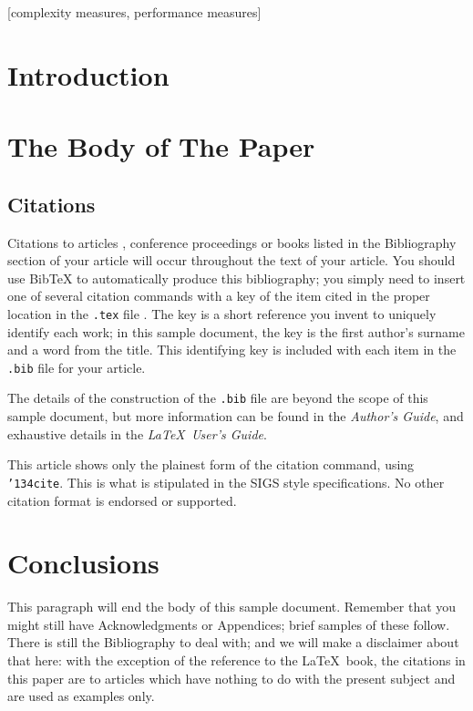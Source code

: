 \documentclass{sig-alternate}
\begin{document}
[complexity measures, performance measures]



\section{Introduction}
\section{The {\secit Body} of The Paper}
\subsection{Citations}
Citations to articles \cite{bowman:reasoning,
clark:pct, braams:babel, herlihy:methodology},
conference proceedings \cite{clark:pct} or
books \cite{salas:calculus, Lamport:LaTeX} listed
in the Bibliography section of your
article will occur throughout the text of your article.
You should use BibTeX to automatically produce this bibliography;
you simply need to insert one of several citation commands with
a key of the item cited in the proper location in
the \texttt{.tex} file \cite{Lamport:LaTeX}.
The key is a short reference you invent to uniquely
identify each work; in this sample document, the key is
the first author's surname and a
word from the title.  This identifying key is included
with each item in the \texttt{.bib} file for your article.

The details of the construction of the \texttt{.bib} file
are beyond the scope of this sample document, but more
information can be found in the \textit{Author's Guide},
and exhaustive details in the \textit{\LaTeX\ User's
Guide}\cite{Lamport:LaTeX}.

This article shows only the plainest form
of the citation command, using \texttt{{\char'134}cite}.
This is what is stipulated in the SIGS style specifications.
No other citation format is endorsed or supported.

\section{Conclusions}
This paragraph will end the body of this sample document.
Remember that you might still have Acknowledgments or
Appendices; brief samples of these
follow.  There is still the Bibliography to deal with; and
we will make a disclaimer about that here: with the exception
of the reference to the \LaTeX\ book, the citations in
this paper are to articles which have nothing to
do with the present subject and are used as
examples only.
\end{document}
